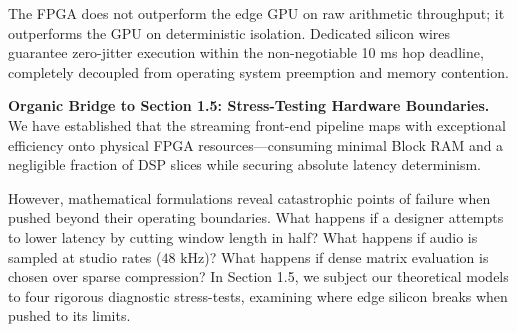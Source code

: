 \documentclass[11pt,a4paper]{article}
\begin{document}
\begin{groundbreaking}
The FPGA does not outperform the edge GPU on raw arithmetic throughput; it outperforms the GPU on deterministic isolation. Dedicated silicon wires guarantee zero-jitter execution within the non-negotiable 10 ms hop deadline, completely decoupled from operating system preemption and memory contention.
\end{groundbreaking}

\vspace{2mm}
\noindent\textbf{Organic Bridge to Section 1.5: Stress-Testing Hardware Boundaries.} We have established that the streaming front-end pipeline maps with exceptional efficiency onto physical FPGA resources---consuming minimal Block RAM and a negligible fraction of DSP slices while securing absolute latency determinism. 

However, mathematical formulations reveal catastrophic points of failure when pushed beyond their operating boundaries. What happens if a designer attempts to lower latency by cutting window length in half? What happens if audio is sampled at studio rates ($48\text{ kHz}$)? What happens if dense matrix evaluation is chosen over sparse compression? In Section 1.5, we subject our theoretical models to four rigorous diagnostic stress-tests, examining where edge silicon breaks when pushed to its limits.
\end{document}
